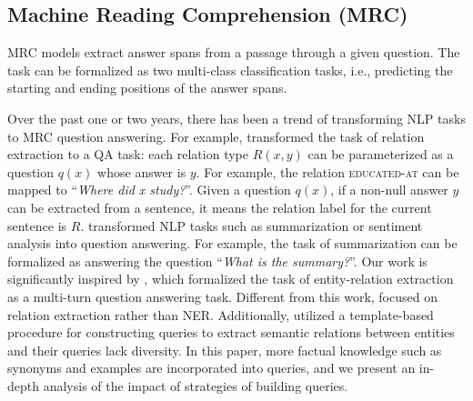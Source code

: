 \documentclass[11pt,a4paper]{article}
\begin{document}
\subsection{Machine Reading Comprehension (MRC)}
MRC models  \cite{seo2016bidirectional,wang2016multi,wang2016machine,xiong2016dynamic,xiong2017dcn,wang2016multi,shen2017reasonet,chen2017reading} extract answer spans from a passage through a given question. 
The task can be formalized as two multi-class classification tasks, i.e., predicting the starting and ending positions of the answer spans.

Over the past one or two years, 
there has been a trend of 
 transforming NLP tasks to MRC question answering. For example, \citet{levy2017zero} 
transformed the task of relation extraction to a QA task:
each relation type $R(x,y)$ can be parameterized as a question $q(x)$ whose answer is $y$. For example, the relation \textsc{educated-at}
can be mapped to  “{\it Where did x study?}”. 
Given a question $q(x)$, 
if a non-null answer $y$ can be extracted from a sentence, it means 
the relation label for the current sentence is $R$. 
 transformed 
 NLP tasks such as summarization or sentiment analysis 
    into question answering. 
For example, the task of summarization can  be formalized as answering the question ``{\it What is the
summary?}''. 
Our work is significantly inspired by , which formalized the task of entity-relation extraction as a multi-turn question answering task.
Different from this work,  focused on relation extraction rather than NER.
Additionally,  
 utilized a template-based procedure for constructing queries to extract semantic relations between entities and their queries lack  diversity. 
In this paper, more factual knowledge such as synonyms and examples are incorporated into queries, and
we  present an in-depth analysis of the impact of strategies of building queries. 
\end{document}
